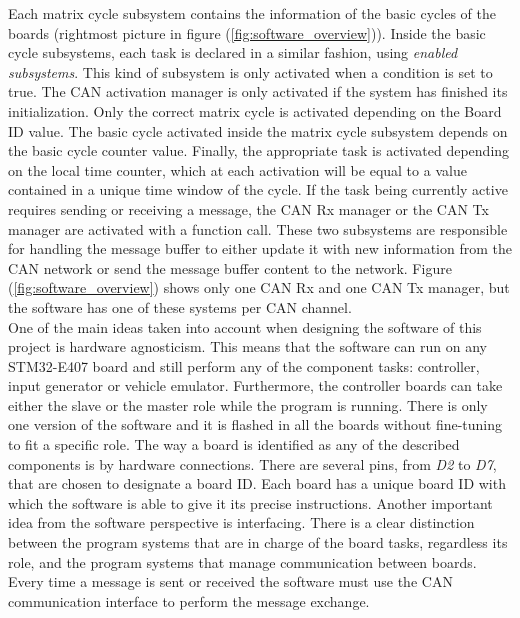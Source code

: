 \documentclass[table,xcdraw]{article}
\begin{document}
Each matrix cycle subsystem contains the information of the basic cycles of the boards (rightmost picture in figure (\ref{fig:software_overview})). Inside the basic cycle subsystems, each task is declared in a similar fashion, using \textit{enabled subsystems}. This kind of subsystem is only activated when a condition is set to true. The CAN activation manager is only activated if the system has finished its initialization. Only the correct matrix cycle is activated depending on the Board ID value. The basic cycle activated inside the matrix cycle subsystem depends on the basic cycle counter value. Finally, the appropriate task is activated depending on the local time counter, which at each activation will be equal to a value contained in a unique time window of the cycle. If the task being currently active requires sending or receiving a message, the CAN Rx manager or the CAN Tx manager are activated with a function call. These two subsystems are responsible for handling the message buffer to either update it with new information from the CAN network or send the message buffer content to the network. Figure (\ref{fig:software_overview}) shows only one CAN Rx and one CAN Tx manager, but the software has one of these systems per CAN channel.\\


One of the main ideas taken into account when designing the software of this project is hardware agnosticism. This means that the software can run on any STM32-E407 board and still perform any of the component tasks: controller, input generator or vehicle emulator. Furthermore, the controller boards can take either the slave or the master role while the program is running. There is only one version of the software and it is flashed in all the boards without fine-tuning to fit a specific role. The way a board is identified as any of the described components is by hardware connections. There are several pins, from \textit{D2} to \textit{D7}, that are chosen to designate a board ID. Each board has a unique board ID with which the software is able to give it its precise instructions. Another important idea from the software perspective is interfacing. There is a clear distinction between the program systems that are in charge of the board tasks, regardless its role, and the program systems that manage communication between boards. Every time a message is sent or received the software must use the CAN communication interface to perform the message exchange.\\
\end{document}
